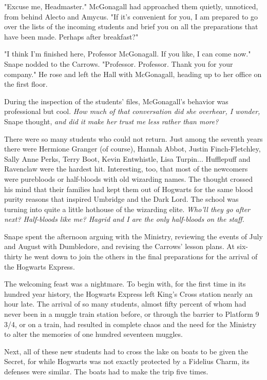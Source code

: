 \documentclass[a4paper,11pt]{article}
\begin{document}
"Excuse me, Headmaster." McGonagall had approached them quietly, unnoticed, from behind Alecto and Amycus. "If it's convenient for you, I am prepared to go over the lists of the incoming students and brief you on all the preparations that have been made. Perhaps after breakfast?"

"I think I'm finished here, Professor McGonagall. If you like, I can come now." Snape nodded to the Carrows. "Professor. Professor. Thank you for your company." He rose and left the Hall with McGonagall, heading up to her office on the first floor.

During the inspection of the students' files, McGonagall's behavior was professional but cool. \emph{How much of that conversation did she overhear, I wonder,} Snape thought, \emph{and did it make her trust me less rather than more?}

There were so many students who could not return. Just among the seventh years there were Hermione Granger (of course), Hannah Abbot, Justin Finch-Fletchley, Sally Anne Perks, Terry Boot, Kevin Entwhistle, Lisa Turpin... Hufflepuff and Ravenclaw were the hardest hit. Interesting, too, that most of the newcomers were purebloods or half-bloods with old wizarding names. The thought crossed his mind that their families had kept them out of Hogwarts for the same blood purity reasons that inspired Umbridge and the Dark Lord. The school was turning into quite a little hothouse of the wizarding elite. \emph{Who'll they go after next? Half-bloods like me? Hagrid and I are the only half-bloods on the staff.}

Snape spent the afternoon arguing with the Ministry, reviewing the events of July and August with Dumbledore, and revising the Carrows' lesson plans. At six-thirty he went down to join the others in the final preparations for the arrival of the Hogwarts Express.

The welcoming feast was a nightmare. To begin with, for the first time in its hundred year history, the Hogwarts Express left King's Cross station nearly an hour late. The arrival of so many students, almost fifty percent of whom had never been in a muggle train station before, or through the barrier to Platform 9 3/4, or on a train, had resulted in complete chaos and the need for the Ministry to alter the memories of one hundred seventeen muggles.

Next, all of these new students had to cross the lake on boats to be given the Secret, for while Hogwarts was not exactly protected by a Fidelius Charm, its defenses were similar. The boats had to make the trip five times.
\end{document}
